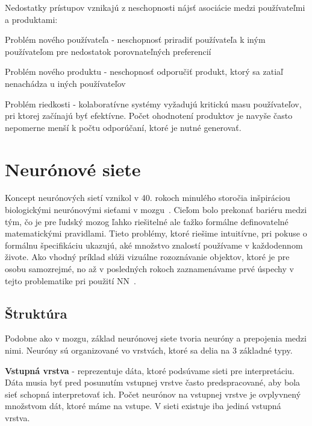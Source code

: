 Nedostatky prístupov vznikajú z neschopnosti nájsť asociácie medzi používateľmi a produktami:

\begin{my_itemize}
	\item{Problém nového používateľa} - neschopnosť priradiť používateľa k iným používateľom pre nedostatok porovnateľných preferencií
	\item{Problém nového produktu} - neschopnosť odporučiť produkt, ktorý sa zatiaľ nenachádza u iných používateľov
	\item{Problém riedkosti} - kolaboratívne systémy vyžadujú kritickú masu používateľov, pri ktorej začínajú byť efektívne. Počet ohodnotení produktov je navyše často nepomerne menší k počtu odporúčaní, ktoré je nutné generovať.
\end{my_itemize} 

\chapter{Neurónové siete}
\label{analyza_neuronove_siete}

Koncept neurónových sietí vznikol v 40. rokoch minulého storočia inšpiráciou biologickými neurónovými sieťami v mozgu~\cite{mcculloch1943logical}.
Cieľom bolo prekonať bariéru medzi tým, čo je pre ľudský mozog ľahko riešitelné ale ťažko formálne definovatelné matematickými pravidlami. Tieto problémy, ktoré riešime intuitívne, pri pokuse o formálnu špecifikáciu ukazujú, aké množstvo znalostí používame v každodennom živote. Ako vhodný príklad slúži vizuálne rozoznávanie objektov, ktoré je pre osobu samozrejmé, no až v posledných rokoch zaznamenávame prvé úspechy v tejto problematike pri použití NN~\cite{Goodfellow-et-al-2016-Book}.

\section{Štruktúra}
\label{analyza_struktura_nn}

Podobne ako v mozgu, základ neurónovej siete tvoria neuróny a prepojenia medzi nimi. Neuróny sú organizované vo vrstvách, ktoré sa delia na 3 základné typy. 
\noindent

\textbf{Vstupná vrstva} - reprezentuje dáta, ktoré podsúvame sieti pre interpretáciu. Dáta musia byť pred posunutím vstupnej vrstve často predspracované, aby bola sieť schopná interpretovať ich. Počet neurónov na vstupnej vrstve je ovplyvnený množstvom dát, ktoré máme na vstupe. V sieti existuje iba jediná vstupná vrstva.
\noindent

